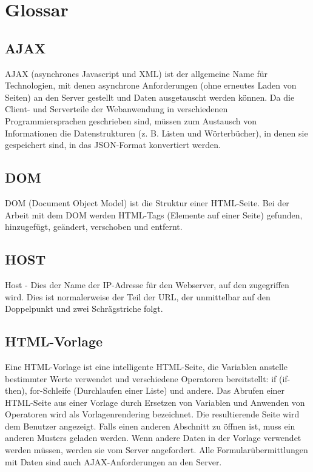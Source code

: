 \chapter*{Glossar}
%
\section*{AJAX}
\label{sec:appendix:ajax}
AJAX (asynchrones Javascript und XML) ist der allgemeine Name für Technologien, mit denen asynchrone Anforderungen (ohne erneutes Laden von Seiten) an den Server gestellt und Daten ausgetauscht werden können. Da die Client- und Serverteile der Webanwendung in verschiedenen Programmiersprachen geschrieben sind, müssen zum Austausch von Informationen die Datenstrukturen (z. B. Listen und Wörterbücher), in denen sie gespeichert sind, in das JSON-Format konvertiert werden.

\section*{DOM}
\label{sec:appendix:dom}
DOM (Document Object Model) ist die Struktur einer HTML-Seite. Bei der Arbeit mit dem DOM werden HTML-Tags (Elemente auf einer Seite) gefunden, hinzugefügt, geändert, verschoben und entfernt.

\section*{HOST}
\label{sec:appendix:host}
Host - Dies  der Name der IP-Adresse für den Webserver, auf den zugegriffen wird. Dies ist normalerweise der Teil der URL, der unmittelbar auf den Doppelpunkt und zwei Schrägstriche folgt.\cite[p.31]{shklar:webapplication} 

\section*{HTML-Vorlage}
\label{sec:appendix:html}
Eine HTML-Vorlage ist eine intelligente HTML-Seite, die Variablen anstelle bestimmter Werte verwendet und verschiedene Operatoren bereitstellt: if (if-then), for-Schleife (Durchlaufen einer Liste) und andere. Das Abrufen einer HTML-Seite aus einer Vorlage durch Ersetzen von Variablen und Anwenden von Operatoren wird als Vorlagenrendering bezeichnet. Die resultierende Seite wird dem Benutzer angezeigt. Falls einen anderen Abschnitt zu öffnen ist, muss ein anderen Musters geladen werden. Wenn andere Daten in der Vorlage verwendet werden müssen, werden sie vom Server angefordert. Alle Formularübermittlungen mit Daten sind auch AJAX-Anforderungen an den Server.

